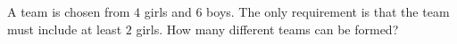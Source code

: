 A team is chosen from $4$ girls and $6$ boys. The only requirement is that the team must include at least $2$ girls. How many different teams can be formed?
